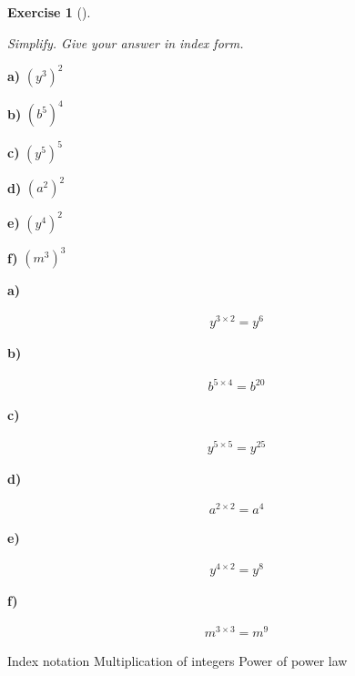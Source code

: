\documentclass[
  letterpaper,
  DIV=11,
  numbers=noendperiod]{scrreprt}
\theoremstyle{definition}
\newtheorem{exercise}{Exercise}[chapter]
\theoremstyle{remark}
\begin{document}
\begin{exercise}[]\protect\hypertarget{exr-u2-8}{}\label{exr-u2-8}

\emph{Simplify. Give your answer in index form.}

\textbf{a)} \(\displaystyle (y^{3})^{2}\)

\textbf{b)} \(\displaystyle (b^{5})^{4}\)

\textbf{c)} \(\displaystyle (y^{5})^{5}\)

\textbf{d)} \(\displaystyle (a^{2})^{2}\)

\textbf{e)} \(\displaystyle (y^{4})^{2}\)

\textbf{f)} \(\displaystyle (m^{3})^{3}\)

\begin{tcolorbox}[enhanced jigsaw, opacitybacktitle=0.6, coltitle=black, arc=.35mm, colframe=quarto-callout-tip-color-frame, colback=white, bottomrule=.15mm, left=2mm, colbacktitle=quarto-callout-tip-color!10!white, titlerule=0mm, opacityback=0, title=\textcolor{quarto-callout-tip-color}{\faLightbulb}\hspace{0.5em}{🔍 View Solutions}, leftrule=.75mm, breakable, rightrule=.15mm, bottomtitle=1mm, toptitle=1mm, toprule=.15mm]

\textbf{a)}

\[
\begin{aligned}
y^{3\times 2} = y^{6}
\end{aligned}
\]

\textbf{b)}

\[
\begin{aligned}
b^{5\times 4} = b^{20}
\end{aligned}
\]

\textbf{c)}

\[
\begin{aligned}
y^{5\times 5} = y^{25}
\end{aligned}
\]

\textbf{d)}

\[
\begin{aligned}
a^{2\times 2} = a^{4}
\end{aligned}
\]

\textbf{e)}

\[
\begin{aligned}
y^{4\times 2} = y^{8}
\end{aligned}
\]

\textbf{f)}

\[
\begin{aligned}
m^{3\times 3} = m^{9}
\end{aligned}
\]

\end{tcolorbox}

{Index notation} {Multiplication of integers} {Power of power law}

\end{exercise}
\end{document}
